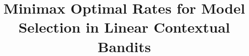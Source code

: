 \documentclass[9pt,twoside]{extarticle} %
\title{Minimax Optimal Rates for Model Selection in Linear Contextual Bandits}
\begin{document}
\maketitle





%

\nocite{*}
 

\appendix
%


\end{document}
